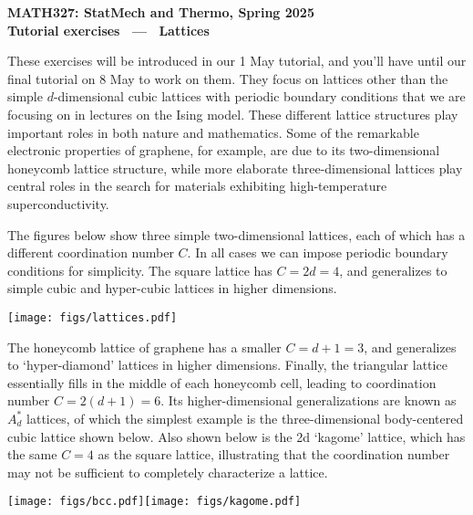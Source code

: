 \documentclass[12 pt]{article} %
\begin{document}
\newcommand{\thisunit}{MATH327 Tutorial (Lattices)}
\newcommand{\moddate}{Last modified 30 Apr.~2025}
\begin{center}
  {\Large \textbf{MATH327: StatMech and Thermo, Spring 2025}} \\[12 pt]
  {\Large \textbf{Tutorial exercises \ --- \ Lattices}} \\[24 pt]
\end{center}

These exercises will be introduced in our 1 May tutorial, and you'll have until our final tutorial on 8 May to work on them.
They focus on lattices other than the simple $d$-dimensional cubic lattices with periodic boundary conditions that we are focusing on in lectures on the Ising model.
These different lattice structures play important roles in both nature and mathematics.
Some of the remarkable electronic properties of graphene, for example, are due to its two-dimensional honeycomb lattice structure, while more elaborate three-dimensional lattices play central roles in the search for materials exhibiting high-temperature superconductivity.

The figures below show three simple two-dimensional lattices, each of which has a different coordination number $C$. %
In all cases we can impose periodic boundary conditions for simplicity.
The square lattice has $C = 2d = 4$, and generalizes to simple cubic and hyper-cubic lattices in higher dimensions. \\[-24 pt]
\begin{center}\texttt{[image: figs/lattices.pdf]}\end{center}

The honeycomb lattice of graphene has a smaller $C = d + 1 = 3$, and generalizes to `hyper-diamond' lattices in higher dimensions.
Finally, the triangular lattice essentially fills in the middle of each honeycomb cell, leading to coordination number $C = 2(d + 1) = 6$.
Its higher-dimensional generalizations are known as $A_d^*$ lattices, of which the simplest example is the three-dimensional body-centered cubic lattice shown below.
Also shown below is the 2d `kagome' lattice, which has the same $C = 4$ as the square lattice, illustrating that the coordination number may not be sufficient to completely characterize a lattice.

\begin{center}\texttt{[image: figs/bcc.pdf]}\hspace{0.25\textwidth}\texttt{[image: figs/kagome.pdf]}\end{center}
\end{document}
